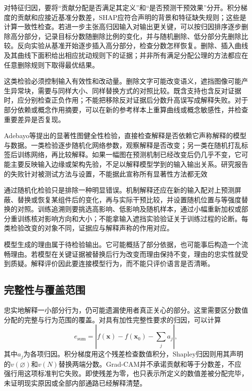 对特征归因，要将“贡献分配是否满足其定义”和“是否预测干预效果”分开。积分梯度的贡献和应接近基准分数差，SHAP应符合声明的背景和特征缺失规则；这些是计算一致性检查。若进一步主张高归因输入对输出更关键，可以按归因排序逐步删除高分部分，记录目标分数随删除比例的变化，并与随机删除、低分部分先删除比较。反向实验从基准开始逐步插入高分部分，检查分数怎样恢复。删除、插入曲线及其曲线下面积给出相应扰动规则下的证据；并非所有满足分配公理的方法都应在任意删除规则下取得最优结果。

这类检验必须控制输入有效性和改动量。删除文字可能改变语义，遮挡图像可能产生异常块，需要与同样大小、同样替换方式的对照比较。既含支持也含反对证据时，应分别检查正负作用；不能把移除反对证据后分数升高误写成解释失败。对于部分依赖或概念作用摘要，可以在新的参考样本上重算曲线或概念敏感性，并检查重要差异是否复现。

Adebayo等提出的显著性图健全性检验，直接检查解释是否依赖它声称解释的模型与数据。一类检验逐步随机化网络参数，观察解释是否改变；另一类在随机打乱标签后训练网络，再比较解释。如果一幅图在预测机制已经改变后仍几乎不变，它可能主要反映输入边缘或架构先验，不足以解释模型学到的输入输出关系。研究报告的失败针对被测试方法与设置，不能据此宣称所有显著性方法都无效

通过随机化检验只是排除一种明显错误。机制解释还应在新的输入配对上预测屏蔽、替换或恢复某组件后的变化，再与实际干预比较，并设置随机位置与等强度替换的对照。训练追溯则要挑选高影响、低影响及随机样本，通过小幅重新加权或部分重训练核对影响方向和大小；不能拿输入遮挡实验验证关于训练过程的论断。每类检验改变的对象不同，证据应与解释声称的作用对应。

模型生成的理由属于待检验输出。它可能概括了部分依据，也可能事后构造一个流畅理由。若模型在关键证据被替换后行为改变而理由保持不变，理由的忠实性就受到质疑。解释评价因此要连接模型行为，而不能只评价语言是否清晰。

\subsection{完整性与覆盖范围}
\label{sec:interpretability-quality-coverage}

忠实地解释一小部分行为，仍可能遗漏使用者真正关心的部分。这里需要区分数值分配的完整与行为范围的覆盖。对具有加性完整性要求的归因，可以计算
\[
 e_{\mathrm{sum}}
 =\left|f(\bm{x})-f(\bm{x}_0)-\sum_j a_j\right|,
\]
其中$a_j$为各项归因。积分梯度用这个残差检查数值积分，Shapley归因则用其声明的$v(\varnothing)$和$v(N)$替换两端分数。Grad-CAM并不承诺贡献和等于分数差，不应强行用这项标准判它失败。即使残差为零，也只表示所定义的数值差被分配完毕，未证明现实原因或全部内部通路已经解释清楚。

